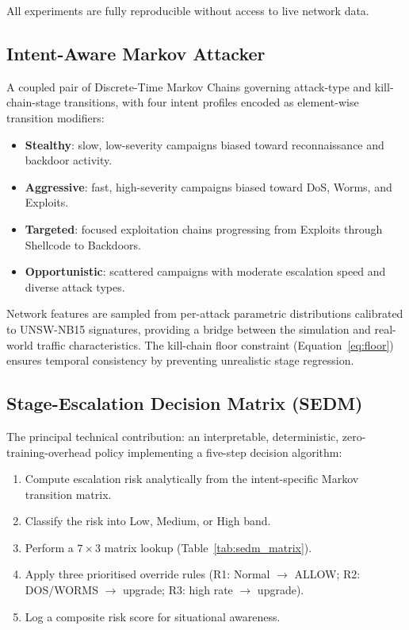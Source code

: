 All experiments are fully reproducible without access to live network data.

\subsection{Intent-Aware Markov Attacker}

A coupled pair of Discrete-Time Markov Chains governing attack-type and
kill-chain-stage transitions, with four intent profiles encoded as element-wise
transition modifiers:
%
\begin{itemize}
  \item \textbf{Stealthy}: slow, low-severity campaigns biased toward
        reconnaissance and backdoor activity.
  \item \textbf{Aggressive}: fast, high-severity campaigns biased toward
        DoS, Worms, and Exploits.
  \item \textbf{Targeted}: focused exploitation chains progressing from
        Exploits through Shellcode to Backdoors.
  \item \textbf{Opportunistic}: scattered campaigns with moderate escalation
        speed and diverse attack types.
\end{itemize}

Network features are sampled from per-attack parametric distributions
calibrated to UNSW-NB15 signatures, providing a bridge between the simulation
and real-world traffic characteristics.
The kill-chain floor constraint (Equation~\ref{eq:floor}) ensures temporal
consistency by preventing unrealistic stage regression.

\subsection{Stage-Escalation Decision Matrix (SEDM)}

The principal technical contribution: an interpretable, deterministic, zero-
training-overhead policy implementing a five-step decision algorithm:
%
\begin{enumerate}
  \item Compute escalation risk analytically from the intent-specific Markov
        transition matrix.
  \item Classify the risk into Low, Medium, or High band.
  \item Perform a $7 \times 3$ matrix lookup (Table~\ref{tab:sedm_matrix}).
  \item Apply three prioritised override rules (R1: Normal $\to$ ALLOW;
        R2: DOS/WORMS $\to$ upgrade; R3: high rate $\to$ upgrade).
  \item Log a composite risk score for situational awareness.
\end{enumerate}

